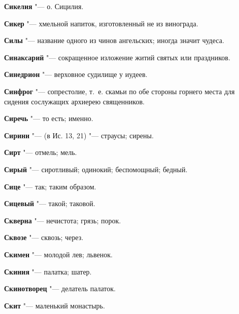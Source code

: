\begin{mymulticols}{2}
\noindent\textbf{Сикелия} "--- о. Сицилия. 




\noindent\textbf{Сикер} "--- хмельной напиток, изготовленный не из винограда. 




\noindent\textbf{Силы} "--- название одного из чинов ангельских; иногда значит чудеса. 




\noindent\textbf{Синаксарий} "--- сокращенное изложение житий святых или праздников. 




\noindent\textbf{Синедрион} "--- верховное судилище у иудеев. 




\noindent\textbf{Синфрог} "--- сопрестолие, т.~е. скамьи по обе стороны горнего места для сидения сослужащих архиерею священников. 




\noindent\textbf{Сиречь} "--- то есть; именно. 




\noindent\textbf{Сирини} "--- (в Ис. 13, 21) "--- страусы; сирены. 




\noindent\textbf{Сирт} "--- отмель; мель. 




\noindent\textbf{Сирый} "--- сиротливый; одинокий; беспомощный; бедный. 




\noindent\textbf{Сице} "--- так; таким образом. 




\noindent\textbf{Сицевый} "--- такой; таковой. 




\noindent\textbf{Скверна} "--- нечистота; грязь; порок. 




\noindent\textbf{Сквозе} "--- сквозь; через. 




\noindent\textbf{Скимен} "--- молодой лев; львенок. 




\noindent\textbf{Скиния} "--- палатка; шатер. 




\noindent\textbf{Скинотворец} "--- делатель палаток. 




\noindent\textbf{Скит} "--- маленький монастырь. 





\end{mymulticols}
